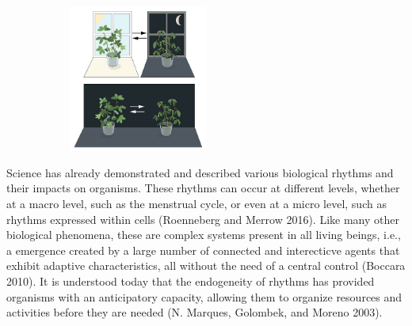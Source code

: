 \documentclass[
  12pt,
  a4paper,
  oneside]{tesesusp}
\begin{document}
\begin{figure}

\caption{\label{fig-ch-1-nobel-prize-2017-de-mairan-experiment}Illustration
of a circadian rhythm in the movement of the leaves of the sensitive
plant (\emph{mimosa pudica}) observed by Jacques d'Ortous de Mairan in
1729.\\
Reproduction from Nobel Prize Outreach AB (n.d.).}

{\centering 

\begin{figure}[H]

{\centering \includegraphics[width=0.5\textwidth,height=\textheight]{images/nobel-prize-outreach-ab-2017-de-mairan-experiment.jpg}

}

\end{figure}

}

\end{figure}

Science has already demonstrated and described various biological
rhythms and their impacts on organisms. These rhythms can occur at
different levels, whether at a macro level, such as the menstrual cycle,
or even at a micro level, such as rhythms expressed within cells
(Roenneberg and Merrow 2016). Like many other biological phenomena,
these are complex systems present in all living beings, i.e., a
emergence created by a large number of connected and interecticve agents
that exhibit adaptive characteristics, all without the need of a central
control (Boccara 2010). It is understood today that the endogeneity of
rhythms has provided organisms with an anticipatory capacity, allowing
them to organize resources and activities before they are needed (N.
Marques, Golombek, and Moreno 2003).
\end{document}
